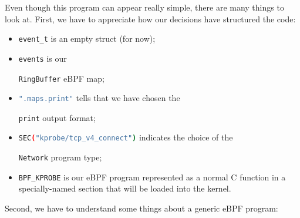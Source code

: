 Even though this program can appear really simple, there are many things to look at.
First, we have to appreciate how our decisions have structured the code:

\begin{itemize}
	\item 
		\raggedright\colorbox{backcolour}{\lstinline[style=commandline, language=bash]|event_t|} is an empty struct (for now);
	\item 
		\raggedright\colorbox{backcolour}{\lstinline[style=commandline, language=bash]|events|} is our \raggedright\colorbox{backcolour}{\lstinline[style=commandline, language=bash]|RingBuffer|} eBPF map;
	\item 
		\raggedright\colorbox{backcolour}{\lstinline[style=commandline, language=bash]|".maps.print"|} tells that we have chosen the \raggedright\colorbox{backcolour}{\lstinline[style=commandline, language=bash]|print|} output format;
	\item 
		\raggedright\colorbox{backcolour}{\lstinline[style=commandline, language=bash]|SEC("kprobe/tcp_v4_connect")|} indicates the choice of the \raggedright\colorbox{backcolour}{\lstinline[style=commandline, language=bash]|Network|} program type;
	\item 
		\raggedright\colorbox{backcolour}{\lstinline[style=commandline, language=bash]|BPF_KPROBE|} is our eBPF program represented as a normal C function in a specially-named section that will be loaded into the kernel.
\end{itemize}

Second, we have to understand some things about a generic eBPF program:


